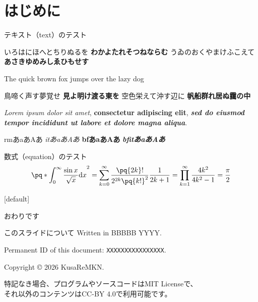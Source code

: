 \documentclass[
  lualatex,
  aspectratio=169,
  fleqn,
  14pt,
]{beamer}
\DeclarePairedDelimiter\pq\lparen\rparen
\begin{document}
\section{はじめに}

\begin{frame}{テキスト（text）のテスト}

  いろはにほへとちりぬるを
  \textbf{わかよたれそつねならむ}
  うゐのおくやまけふこえて
  \textbf{あさきゆめみしゑひもせす}

  The quick brown fox jumps over the lazy dog

  鳥啼く声す夢覚せ
  \textbf{見よ明け渡る東を}
  空色栄えて沖す辺に
  \textbf{帆船群れ居ぬ靄の中}

  \textit{Lorem ipsum dolor sit amet},
  \textbf{consectetur adipiscing elit},
  \textbf{\textit{sed do eiusmod tempor incididunt ut labore et dolore magna aliqua}}.

  rmあaあAあ
  \textit{itあaあAあ}
  \textbf{bfあaあAあ}
  \textbf{\textit{bfitあaあAあ}}
\end{frame}

\begin{frame}{数式（equation）のテスト}
  \begin{equation}
    \pq*{\int_{0}^{\infty} \frac{\sin{x}}{\sqrt{x}} \mathrm{d}x}^2
    = \sum_{k=0}^{\infty} \frac{\pq{2k}!}{2^{2k}\pq{k!}^2} \frac{1}{2k+1}
    = \prod_{k=1}^{\infty} \frac{4k^2}{4k^2-1}
    = \frac{\pi}{2}
  \end{equation}
\end{frame}

\appendix
{}[default]

\begin{frame}[standout]
  おわりです
\end{frame}

\begin{frame}{このスライドについて}
  Written in BBBBB YYYY.
  \vspace{\baselineskip}

  Permanent ID of this document: \texttt{XXXXXXXXXXXXXXXX}.
  \vspace{\baselineskip}

  Copyright {\copyright} 2026 KusaReMKN.
  \vspace{\baselineskip}

  \small
  特記なき場合、プログラムやソースコードはMIT Licenseで、\\
  \hspace{1.5\zw}それ以外のコンテンツはCC-BY 4.0で利用可能です。
\end{frame}
\end{document}
